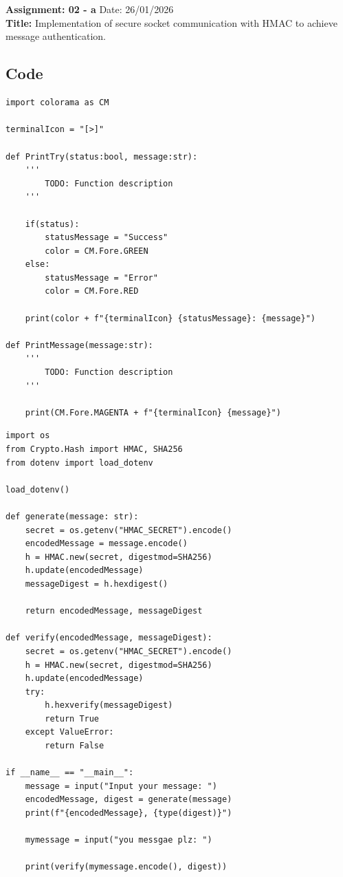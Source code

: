 \section{}
\noindent \textbf{Assignment: 02 - a}
\hfill Date: 26/01/2026 \\
\noindent
\textbf{Title:} Implementation of secure socket communication with HMAC to achieve message authentication.

\subsection*{Code}
\begin{lstlisting}[style=mypython, caption={TerminalMessage.py}, label={code:A-2-a-TerminalMessage}]
import colorama as CM

terminalIcon = "[>]"

def PrintTry(status:bool, message:str):
    '''
        TODO: Function description
    '''

    if(status):
        statusMessage = "Success"
        color = CM.Fore.GREEN
    else:
        statusMessage = "Error"
        color = CM.Fore.RED

    print(color + f"{terminalIcon} {statusMessage}: {message}")

def PrintMessage(message:str):
    '''
        TODO: Function description
    '''

    print(CM.Fore.MAGENTA + f"{terminalIcon} {message}")
\end{lstlisting}

\begin{lstlisting}[style=mypython, caption={HMAC.py}, label={code:A-2-a-HMAC}]
import os
from Crypto.Hash import HMAC, SHA256
from dotenv import load_dotenv

load_dotenv()

def generate(message: str):
    secret = os.getenv("HMAC_SECRET").encode()
    encodedMessage = message.encode()
    h = HMAC.new(secret, digestmod=SHA256)
    h.update(encodedMessage)
    messageDigest = h.hexdigest()

    return encodedMessage, messageDigest

def verify(encodedMessage, messageDigest):
    secret = os.getenv("HMAC_SECRET").encode()
    h = HMAC.new(secret, digestmod=SHA256)
    h.update(encodedMessage)
    try:
        h.hexverify(messageDigest)
        return True
    except ValueError:
        return False

if __name__ == "__main__":
    message = input("Input your message: ")
    encodedMessage, digest = generate(message)
    print(f"{encodedMessage}, {type(digest)}")

    mymessage = input("you messgae plz: ")

    print(verify(mymessage.encode(), digest))
\end{lstlisting}


